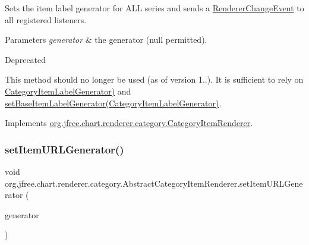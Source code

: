 Sets the item label generator for A\+LL series and sends a \mbox{\hyperlink{}{Renderer\+Change\+Event}} to all registered listeners.


\begin{DoxyParams}{Parameters}
{\em generator} & the generator ({\ttfamily null} permitted).\\
\hline
\end{DoxyParams}
\begin{DoxyRefDesc}{Deprecated}
\item[\mbox{\hyperlink{deprecated__deprecated000149}{Deprecated}}]This method should no longer be used (as of version 1..). It is sufficient to rely on \mbox{\hyperlink{}{Category\+Item\+Label\+Generator)}} and \mbox{\hyperlink{classorg_1_1jfree_1_1chart_1_1renderer_1_1category_1_1_abstract_category_item_renderer_a3752262b1c62f959e47ba3542e1e7149}{set\+Base\+Item\+Label\+Generator(\+Category\+Item\+Label\+Generator)}}. \end{DoxyRefDesc}


Implements \mbox{\hyperlink{interfaceorg_1_1jfree_1_1chart_1_1renderer_1_1category_1_1_category_item_renderer_a5324b404df0d22be7a5fe117c1da97bf}{org.\+jfree.\+chart.\+renderer.\+category.\+Category\+Item\+Renderer}}.

\mbox{\label{classorg_1_1jfree_1_1chart_1_1renderer_1_1category_1_1_abstract_category_item_renderer_a2c58205b64cd00e63f486d160cf77bfd}} 
\subsubsection{\texorpdfstring{set\+Item\+U\+R\+L\+Generator()}{setItemURLGenerator()}}
{\footnotesize\ttfamily void org.\+jfree.\+chart.\+renderer.\+category.\+Abstract\+Category\+Item\+Renderer.\+set\+Item\+U\+R\+L\+Generator (\begin{DoxyParamCaption}\item[{\mbox{\hyperlink{interfaceorg_1_1jfree_1_1chart_1_1urls_1_1_category_u_r_l_generator}{Category\+U\+R\+L\+Generator}}}]{generator }\end{DoxyParamCaption})}

